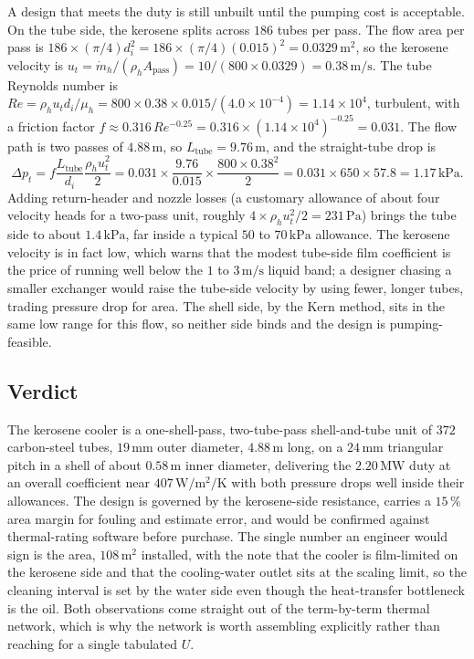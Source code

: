 A design that meets the duty is still unbuilt until the pumping cost is
acceptable. On the tube side, the kerosene splits across $186$ tubes per
pass. The flow area per pass is $186 \times (\pi/4) d_i^2 = 186 \times
(\pi/4)(0.015)^2 = 0.0329\,\text{m}^2$, so the kerosene velocity is $u_t
= \dot{m}_h/(\rho_h A_{\text{pass}}) = 10/(800 \times 0.0329) = 0.38\,
\text{m/s}$. The tube Reynolds number is $Re = \rho_h u_t d_i/\mu_h =
800 \times 0.38 \times 0.015/(4.0\times 10^{-4}) = 1.14\times 10^4$,
turbulent, with a friction factor $f \approx 0.316\,Re^{-0.25} = 0.316
\times (1.14\times 10^4)^{-0.25} = 0.031$. The flow path is two passes of
$4.88\,\text{m}$, so $L_{\text{tube}} = 9.76\,\text{m}$, and the
straight-tube drop is
\[
\Delta p_t = f\frac{L_{\text{tube}}}{d_i}\frac{\rho_h u_t^2}{2} = 0.031
\times \frac{9.76}{0.015} \times \frac{800 \times 0.38^2}{2} = 0.031
\times 650 \times 57.8 = 1.17\,\text{kPa}.
\]
Adding return-header and nozzle losses (a customary allowance of about
four velocity heads for a two-pass unit, roughly $4 \times \rho_h
u_t^2/2 = 231\,\text{Pa}$) brings the tube side to about $1.4\,\text{
kPa}$, far inside a typical $50$ to $70\,\text{kPa}$ allowance. The
kerosene velocity is in fact low, which warns that the modest tube-side
film coefficient is the price of running well below the $1$ to $3\,\text{
m/s}$ liquid band; a designer chasing a smaller exchanger would raise the
tube-side velocity by using fewer, longer tubes, trading pressure drop
for area. The shell side, by the Kern method, sits in the same low range
for this flow, so neither side binds and the design is pumping-feasible.

\subsection{Verdict}

The kerosene cooler is a one-shell-pass, two-tube-pass shell-and-tube
unit of $372$ carbon-steel tubes, $19\,\si{\milli\meter}$ outer diameter,
$4.88\,\text{m}$ long, on a $24\,\si{\milli\meter}$ triangular pitch in
a shell of about $0.58\,\text{m}$ inner diameter, delivering the
$2.20\,\text{MW}$ duty at an overall coefficient near $407\,\si{\watt
\per\meter\squared\per\kelvin}$ with both pressure drops well inside
their allowances. The design is governed by the kerosene-side
resistance, carries a $15\,\%$ area margin for fouling and estimate
error, and would be confirmed against thermal-rating software before
purchase. The single number an engineer would sign is the area,
$108\,\text{m}^2$ installed, with the note that the cooler is
film-limited on the kerosene side and that the cooling-water outlet sits
at the scaling limit, so the cleaning interval is set by the water side
even though the heat-transfer bottleneck is the oil. Both observations
come straight out of the term-by-term thermal network, which is why the
network is worth assembling explicitly rather than reaching for a single
tabulated $U$.

